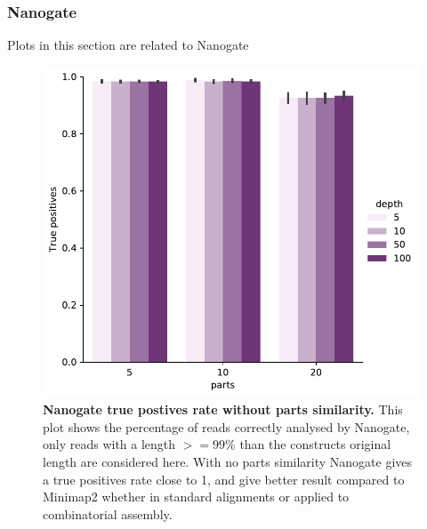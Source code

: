 \documentclass[11pt, a4paper]{article}
\begin{document}
\subsubsection{Nanogate}


Plots in this section are related to Nanogate

\begin{figure}[ht]
    \begin{center}
    \includegraphics[width=1\textwidth]{../results/images_notebook/v_400/nanogate_sim_00_good_reads_true_positves.pdf}
    \end{center}
    \caption{{\bf  Nanogate true postives rate without parts similarity.} This plot shows the percentage of reads correctly analysed by Nanogate, only reads with a length $>=99\%$ than the constructs original length are considered here. With no parts similarity Nanogate gives a true positives rate close to 1,
    and give better result compared to Minimap2 whether in standard alignments or applied to combinatorial assembly.}
   \label{fig:v_400_nanogate_accuracy_sim_0}
\end{figure}
\end{document}
